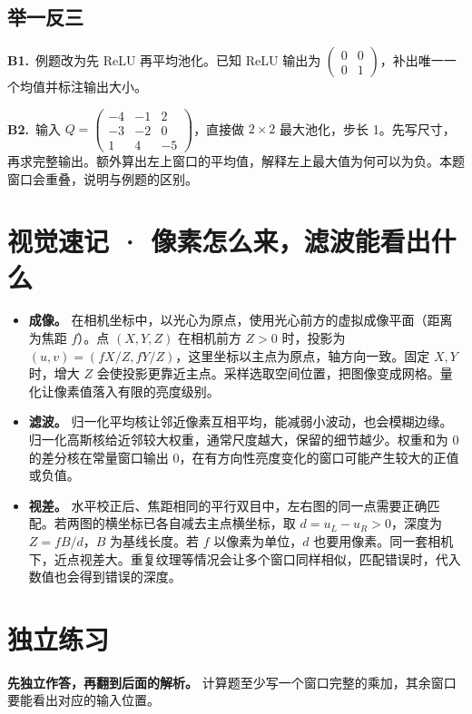 \documentclass[UTF8,a4paper,11pt]{ctexart}
\newcommand{\CompactQuestion}[2]{\par\noindent\textbf{#1.}\ #2\par\vspace{.8em}}
\begin{document}
\subsection{举一反三}
\CompactQuestion{B1}{例题改为先 ReLU 再平均池化。已知 ReLU 输出为 $\begin{pmatrix}0&0\\0&1\end{pmatrix}$，补出唯一一个均值并标注输出大小。}
\CompactQuestion{B2}{输入 $Q=\begin{pmatrix}-4&-1&2\\-3&-2&0\\1&4&-5\end{pmatrix}$，直接做 $2\times2$ 最大池化，步长 1。先写尺寸，再求完整输出。额外算出左上窗口的平均值，解释左上最大值为何可以为负。本题窗口会重叠，说明与例题的区别。}
\section{视觉速记 · 像素怎么来，滤波能看出什么}
\begin{itemize}
\item \textbf{成像。} 在相机坐标中，以光心为原点，使用光心前方的虚拟成像平面（距离为焦距 $f$）。点 $(X,Y,Z)$ 在相机前方 $Z>0$ 时，投影为 $(u,v)=(fX/Z,fY/Z)$，这里坐标以主点为原点，轴方向一致。固定 $X,Y$ 时，增大 $Z$ 会使投影更靠近主点。采样选取空间位置，把图像变成网格。量化让像素值落入有限的亮度级别。
\item \textbf{滤波。} 归一化平均核让邻近像素互相平均，能减弱小波动，也会模糊边缘。归一化高斯核给近邻较大权重，通常尺度越大，保留的细节越少。权重和为 0 的差分核在常量窗口输出 0，在有方向性亮度变化的窗口可能产生较大的正值或负值。
\item \textbf{视差。} 水平校正后、焦距相同的平行双目中，左右图的同一点需要正确匹配。若两图的横坐标已各自减去主点横坐标，取 $d=u_L-u_R>0$，深度为 $Z=fB/d$，$B$ 为基线长度。若 $f$ 以像素为单位，$d$ 也要用像素。同一套相机下，近点视差大。重复纹理等情况会让多个窗口同样相似，匹配错误时，代入数值也会得到错误的深度。
\end{itemize}
\clearpage
\section{独立练习}
\textbf{先独立作答，再翻到后面的解析。} 计算题至少写一个窗口完整的乘加，其余窗口要能看出对应的输入位置。
\end{document}
